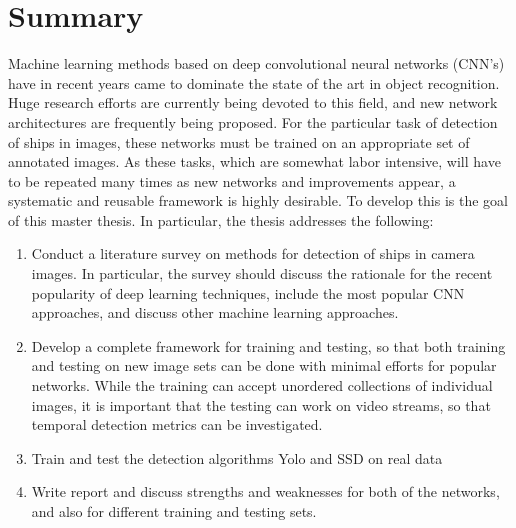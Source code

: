 \clearpage
{} 				
\setcounter{page}{1}

\pagestyle{fancy}
\fancyhf{}
\renewcommand{\chaptermark}[1]{\markboth{\chaptername\ \thechapter.\ #1}{}}
\renewcommand{\sectionmark}[1]{\markright{\thesection\ #1}}
\renewcommand{\headrulewidth}{0.1ex}
\renewcommand{\footrulewidth}{0.1ex}
\fancyfoot[LE,RO]{\thepage}
\fancypagestyle{plain}{\fancyhf{}\fancyfoot[LE,RO]{\thepage}\renewcommand{\headrulewidth}{0ex}}

\section*{\Huge Summary}


\noindent 
Machine learning methods based on deep convolutional neural networks (CNN’s) have in recent years came to dominate the state of the art in object recognition. Huge research efforts are currently being devoted to this field, and new network architectures are frequently being proposed. For the particular task of detection of ships in images, these networks must be trained on an appropriate set of annotated images. As these tasks, which are somewhat labor intensive, will have to be repeated many times as new networks and improvements appear, a systematic and reusable framework is highly desirable. To develop this is the goal of this master thesis. In particular, the thesis addresses the following:

\begin{enumerate}
    \item Conduct a literature survey on methods for detection of ships in camera images. In particular, the survey should discuss the rationale for the recent popularity of deep learning techniques, include the most popular CNN approaches, and discuss other machine learning approaches.
    \item Develop a complete framework for training and testing, so that both training and testing on new image sets can be done with minimal efforts for popular networks. While the training can accept unordered collections of individual images, it is important that the testing can work on video streams, so that temporal detection metrics can be investigated. 
    \item Train and test the detection algorithms Yolo and SSD on real data
    \item Write report and discuss strengths and weaknesses for both of the networks, and also for different training and testing sets.
\end{enumerate}

\clearpage